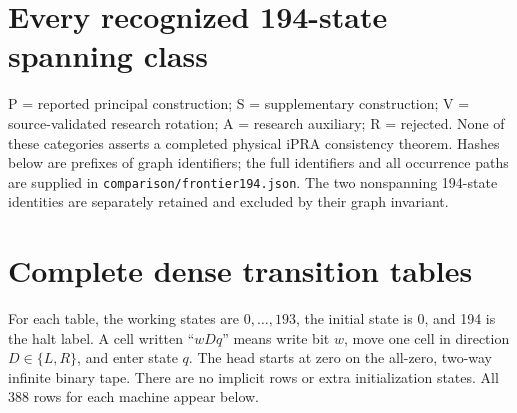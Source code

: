 \documentclass[11pt,a4paper]{article}
\newcommand{\file}[1]{\texttt{\nolinkurl{#1}}}
\begin{document}
\clearpage
\section{Every recognized 194-state spanning class}
\label{app:frontier}
P = reported principal construction; S = supplementary construction;
V = source-validated research rotation; A = research auxiliary;
R = rejected. None of these categories asserts a completed physical
iPRA consistency theorem. Hashes below are prefixes of graph identifiers;
the full identifiers and all occurrence paths are supplied in
\file{comparison/frontier194.json}. The two nonspanning 194-state
identities are separately retained and excluded by their graph invariant.


\clearpage
\section{Complete dense transition tables}
\label{app:tables}
For each table, the working states are $0,\ldots,193$, the initial state
is 0, and 194 is the halt label. A cell written ``$wDq$'' means write
bit $w$, move one cell in direction $D\in\{L,R\}$, and enter state $q$.
The head starts at zero on the all-zero, two-way infinite binary tape.
There are no implicit rows or extra initialization states. All 388
rows for each machine appear below.

\end{document}

